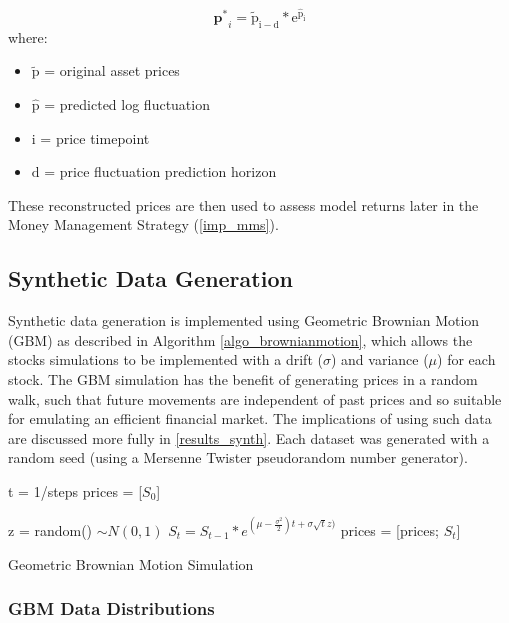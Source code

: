 \documentclass[a4paper,11pt,oneside]{article}
\theoremstyle{plain}
\theoremstyle{definition}
\begin{document}
	\begin{equation}
	\mathbf{p^*}_{i} = \mathrm{\tilde{p}_{i-d} * e^{\hat{p}_{i}}}
	\end{equation}
	where:
	\begin{itemize}
		\item [] $\mathrm{\tilde{p}}$ = original asset prices
		\item [] $\mathrm{\hat{p}}$ = predicted log fluctuation 
		\item [] $\mathrm{i}$ = price timepoint 
		\item [] $\mathrm{d}$ = price fluctuation prediction horizon
		
	\end{itemize}
	\texttt{}\newline
	These reconstructed prices are then used to assess model returns later in the Money Management Strategy (\ref{imp_mms}).
	
	\subsection{Synthetic Data Generation}\label{data_synthetic}
	
	Synthetic data generation is implemented using Geometric Brownian Motion (GBM) as described in Algorithm \ref{algo_brownianmotion}, which allows the stocks simulations to be implemented with a drift ($\sigma$) and variance ($\mu$) for each stock. The GBM simulation has the benefit of generating prices in a random walk, such that future movements are independent of past prices and so suitable for emulating an efficient financial market. The implications of using such data are discussed more fully in \ref{results_synth}. Each dataset was generated with a random seed (using a Mersenne Twister pseudorandom number generator). \newline
	
	\begin{algorithm}[H]
		
		t = 1/steps\;
		prices = [$S_0$]\;
		
		{
			z = random()  $\sim N(0,1)$\;
			$S_t = S_{t-1}*e^{(\mu - \frac {\sigma^2}{2})t + \sigma  \sqrt{t}  z)}$\;
			prices = [prices; $S_t$]\;
		}
		\label{algo_brownianmotion}
		\caption{Geometric Brownian Motion Simulation}
	\end{algorithm}
	
	\subsubsection{GBM Data Distributions}
	
\end{document}
